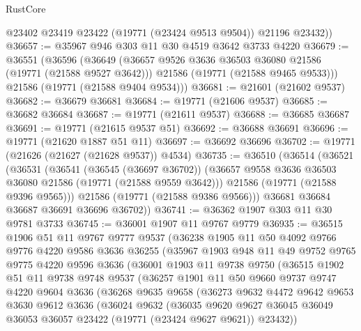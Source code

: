 \begin{lexlean}{RustCore}
\begin{coremodule}
        @23402
        @23419
        @23422
        (@19771 (@23424 @9513 @9504))
        @21196
        @23432))
@36657 := @35967 @946 @303 @11 @30 @4519 @3642 @3733 @4220
@36679 := @36551
    (@36596
      (@36649
        (@36657 @9526 @3636 @36503 @36080 @21586 (@19771 (@21588 @9527 @3642)))
        @21586
        (@19771 (@21588 @9465 @9533)))
      @21586
      (@19771 (@21588 @9404 @9534)))
@36681 := @21601 (@21602 @9537)
@36682 := @36679 @36681
@36684 := @19771 (@21606 @9537)
@36685 := @36682 @36684
@36687 := @19771 (@21611 @9537)
@36688 := @36685 @36687
@36691 := @19771 (@21615 @9537 @51)
@36692 := @36688 @36691
@36696 := @19771 (@21620 @1887 @51 @11)
@36697 := @36692 @36696
@36702 := @19771 (@21626 (@21627 (@21628 @9537)) @4534)
@36735 := @36510
    (@36514
      (@36521
        (@36531
          (@36541
            (@36545 (@36697 @36702))
            (@36657 @9558 @3636 @36503 @36080 @21586 (@19771 (@21588 @9559 @3642)))
            @21586
            (@19771 (@21588 @9396 @9565)))
          @21586
          (@19771 (@21588 @9386 @9566)))
        @36681
        @36684
        @36687
        @36691
        @36696
        @36702))
@36741 := @36362 @1907 @303 @11 @30 @9781 @3733
@36745 := @36001 @1907 @11 @9767 @9779
@36935 := @36515
    @1906
    @51
    @11
    @9767
    @9777
    @9537
    (@36238
      @1905
      @11
      @50
      @4092
      @9766
      @9776
      @4220
      @9586
      @3636
      @36255
      (@35967
        @1903
        @948
        @11
        @49
        @9752
        @9765
        @9775
        @4220
        @9596
        @3636
        (@36001
          @1903
          @11
          @9738
          @9750
          (@36515
            @1902
            @51
            @11
            @9738
            @9748
            @9537
            (@36257
              @1901
              @11
              @50
              @9660
              @9737
              @9747
              @4220
              @9604
              @3636
              (@36268
                @9635
                @9658
                (@36273
                  @9632
                  @4472
                  @9642
                  @9653
                  @3630
                  @9612
                  @3636
                  (@36024
                    @9632
                    (@36035
                      @9620
                      @9627
                      @36045
                      @36049
                      @36053
                      @36057
                      @23422
                      (@19771 (@23424 @9627 @9621))
                      @23432))

\end{coremodule}
\end{lexlean}
